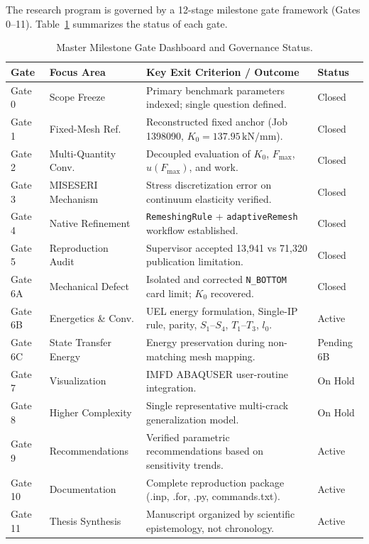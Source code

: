 The research program is governed by a 12-stage milestone gate framework (Gates 0--11). Table~\ref{tab:master_gate_dashboard} summarizes the status of each gate.

\begin{table}[htbp]
\centering
\caption{Master Milestone Gate Dashboard and Governance Status.}
\label{tab:master_gate_dashboard}
\small
\begin{tabular}{llp{5.5cm}l}
\toprule
\textbf{Gate} & \textbf{Focus Area} & \textbf{Key Exit Criterion / Outcome} & \textbf{Status} \\
\midrule
Gate 0 & Scope Freeze & Primary benchmark parameters indexed; single question defined. & Closed \\
Gate 1 & Fixed-Mesh Ref. & Reconstructed fixed anchor (Job 1398090, $K_0=137.95\,\text{kN/mm}$). & Closed \\
Gate 2 & Multi-Quantity Conv. & Decoupled evaluation of $K_0$, $F_{\max}$, $u(F_{\max})$, and work. & Closed \\
Gate 3 & MISESERI Mechanism & Stress discretization error on continuum elasticity verified. & Closed \\
Gate 4 & Native Refinement & \texttt{RemeshingRule} + \texttt{adaptiveRemesh} workflow established. & Closed \\
Gate 5 & Reproduction Audit & Supervisor accepted 13,941 vs 71,320 publication limitation. & Closed \\
Gate 6A & Mechanical Defect & Isolated and corrected \texttt{N\_BOTTOM} card limit; $K_0$ recovered. & Closed \\
Gate 6B & Energetics \& Conv. & UEL energy formulation, Single-IP rule, parity, $S_1$--$S_4$, $T_1$--$T_3$, $l_0$. & Active \\
Gate 6C & State Transfer Energy & Energy preservation during non-matching mesh mapping. & Pending 6B \\
Gate 7 & Visualization & IMFD ABAQUSER user-routine integration. & On Hold \\
Gate 8 & Higher Complexity & Single representative multi-crack generalization model. & On Hold \\
Gate 9 & Recommendations & Verified parametric recommendations based on sensitivity trends. & Active \\
Gate 10 & Documentation & Complete reproduction package (.inp, .for, .py, commands.txt). & Active \\
Gate 11 & Thesis Synthesis & Manuscript organized by scientific epistemology, not chronology. & Active \\
\bottomrule
\end{tabular}
\end{table}

